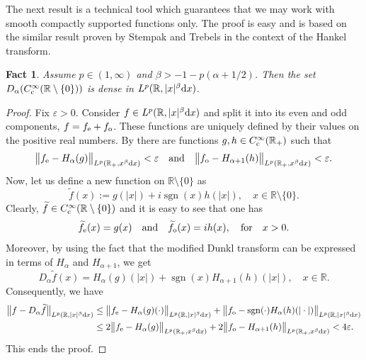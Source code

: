 \documentclass[11pt,oneside]{amsart}
\numberwithin{equation}{section}
\newtheorem{fact}[equation]{Fact}
\theoremstyle{definition}
\newcommand{\RR}{\mathbb{R}}
\newcommand{\sgn}{\operatorname{sgn}}
\begin{document}
The next result is a technical tool which guarantees that we may work with smooth compactly supported functions only. The proof is easy and is based on the similar result proven by Stempak and Trebels \cite{StempakTrebels1997} in the context of the Hankel transform.
\begin{fact}
Assume $p\in(1,\infty)$ and $\beta>-1-p(\alpha+1/2)$. Then the set $D_\alpha(C_{\rm c}^\infty(\RR\setminus\{0\}))$ is dense in $L^p(\RR, |x|^\beta{\rm d}x)$.
\end{fact}
\begin{proof}
Fix $\varepsilon>0$. Consider $f \in L^p(\RR, |x|^\beta{\rm d}x)$ and split it into its even and odd components, $f = f_{\rm e} + f_{\rm o}$. These functions are uniquely defined by their values on the positive real numbers. By \cite[Corollary 4.8]{StempakTrebels1997} there are functions $g,h \in C_{\rm c}^\infty(\RR_+)$ such that
\begin{align*}
    \big\|f_{\rm e} - H_\alpha(g)\big\|_{L^p(\RR_+,x^\beta{\rm d}x)}<\varepsilon\quad\text{and}\quad \big\|f_{\rm o} - H_{\alpha+1}(h)\big\|_{L^p(\RR_+,x^\beta{\rm d}x)}<\varepsilon.
\end{align*}
Now, let us define a new function on $\RR\setminus\{0\}$ as
\begin{equation*}
    \widetilde{f}(x):=g(|x|)+i\sgn(x)h(|x|), \quad x\in\RR\setminus\{0\}.
\end{equation*}
Clearly, $\widetilde{f}\in C_{\rm c}^\infty(\RR\setminus\{0\})$ and it is easy to see that one has
\begin{equation*}
    \widetilde{f}_{\rm e}(x)=g(x)\quad\text{and}\quad \widetilde{f}_{\rm o}(x)=i h(x),\quad\text{for} \quad x>0.
\end{equation*}
Moreover, by using the fact that the modified Dunkl transform can be expressed in terms of $H_\alpha$ and $H_{\alpha+1}$, we get
\begin{equation*}
    D_\alpha \widetilde{f}(x)=H_\alpha(g)(|x|)+ \sgn(x) H_{\alpha+1}(h)(|x|),\quad x\in \RR.
\end{equation*}
Consequently, we have
\begin{align*}
    \big\|f-D_\alpha\widetilde{f}\big\|_{L^p(\RR, |x|^\beta{\rm d}x)}&\leq \big\|f_{\rm e}-H_\alpha(g)(\cdot)\big\|_{L^p(\RR, |x|^\beta{\rm d}x)}+\big\|f_{\rm o}-\sgn(\cdot)H_\alpha(h)(|\cdot|)\big\|_{L^p(\RR, |x|^\beta{\rm d}x)}\\
    &\leq 2\big\|f_{\rm e} - H_\alpha(g)\big\|_{L^p(\RR_+,x^\beta{\rm d}x)}+2\big\|f_{\rm o} - H_{\alpha+1}(h)\big\|_{L^p(\RR_+,x^\beta{\rm d}x)}<4\varepsilon.
\end{align*}
This ends the proof.
\end{proof}
\end{document}
